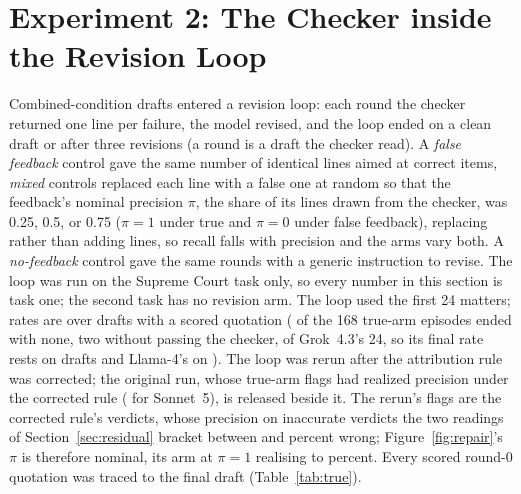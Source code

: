 \documentclass{IOS-Book-Article}
\begin{document}
\section{Experiment 2: The Checker inside the Revision Loop}\label{sec:exp2}

Combined-condition drafts entered a revision loop: each round the checker returned one line per failure, the model revised, and the loop ended on a clean draft or after three revisions (a round is a draft the checker read). A \textit{false feedback} control gave the same number of identical lines aimed at correct items, \textit{mixed} controls replaced each line with a false one at random so that the feedback's nominal precision $\pi$, the share of its lines drawn from the checker, was 0.25, 0.5, or 0.75 ($\pi = 1$ under true and $\pi = 0$ under false feedback), replacing rather than adding lines, so recall falls with precision and the arms vary both. A \textit{no-feedback} control gave the same rounds with a generic instruction to revise. The loop was run on the Supreme Court task only, so every number in this section is task one; the second task has no revision arm. The loop used the first 24 matters; rates are over drafts with a scored quotation (\lcEmptyTrueTotal{} of the 168 true-arm episodes ended with none, two without passing the checker, \lcEmptyTrueGrok{} of Grok~4.3's 24, so its final rate rests on \lcGrokTrueDrafts{} drafts and Llama-4's on \lcAliveLlamaTrue). The loop was rerun after the attribution rule was corrected; the original run, whose true-arm flags had realized precision \rpTrueAll{} under the corrected rule (\rpTrueSonnet{} for Sonnet~5), is released beside it. The rerun's flags are the corrected rule's verdicts, whose precision on inaccurate verdicts the two readings of Section~\ref{sec:residual} bracket between \twoRaterOnePct{} and \twoRaterTwoPct{} percent wrong; Figure~\ref{fig:repair}'s $\pi$ is therefore nominal, its arm at $\pi = 1$ realising \realisedPrecLow{} to \realisedPrecHigh{} percent. Every scored round-0 quotation was traced to the final draft (Table~\ref{tab:true}).
\end{document}
